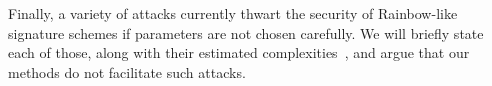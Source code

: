 \documentclass[openright, draft, 10pt]{report}
\begin{document}
Finally, a variety of attacks currently thwart the security of Rainbow-like
signature schemes if parameters are not chosen carefully. We will briefly
state each of those, along with their estimated complexities~\cite{Petzoldt:201005:inproc},
and argue that our methods do not facilitate such attacks.



\end{document}
